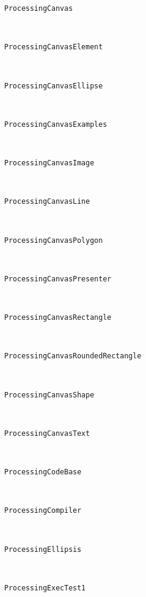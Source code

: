 \begin{description}
\item[\texttt{ProcessingCanvas}] \hfill \\
	
\item[\texttt{ProcessingCanvasElement}] \hfill \\
	
\item[\texttt{ProcessingCanvasEllipse}] \hfill \\
	
\item[\texttt{ProcessingCanvasExamples}] \hfill \\
	
\item[\texttt{ProcessingCanvasImage}] \hfill \\
	
\item[\texttt{ProcessingCanvasLine}] \hfill \\
	
\item[\texttt{ProcessingCanvasPolygon}] \hfill \\
	
\item[\texttt{ProcessingCanvasPresenter}] \hfill \\
	
\item[\texttt{ProcessingCanvasRectangle}] \hfill \\
	
\item[\texttt{ProcessingCanvasRoundedRectangle}] \hfill \\
	
\item[\texttt{ProcessingCanvasShape}] \hfill \\
	
\item[\texttt{ProcessingCanvasText}] \hfill \\
	
\item[\texttt{ProcessingCodeBase}] \hfill \\
	
\item[\texttt{ProcessingCompiler}] \hfill \\
	
\item[\texttt{ProcessingEllipsis}] \hfill \\
	
\item[\texttt{ProcessingExecTest1}] \hfill \\
	

\end{description}
